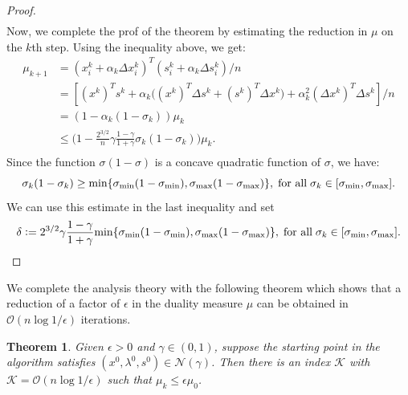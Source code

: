 \documentclass[a4paper,10 pt,titlepage,twoside]{book}
\theoremstyle{plain}
\newtheorem{thm}{Theorem}[chapter]
\theoremstyle{definition}
\theoremstyle{remark}
\begin{document}
\begin{proof}
\begin{align*}
	\end{align*}
	Now, we complete the prof of the theorem by estimating the reduction in $\mu$ on the $k$th step. Using the inequality above, we get:
	\begin{align*}
	\mu_{k+1}& = (x_{i}^{k} + \alpha_{k}\Delta x_{i}^{k})^{T}(s_{i}^{k} + \alpha_{k}\Delta s_{i}^{k})/n\\
	& = [(x^{k})^{T}s^{k} + \alpha_{k}\big((x^{k})^{T}\Delta s^{k} + (s^{k})^{T}\Delta x^{k}\big) +\alpha^{2}_{k}(\Delta x^{k})^{T}\Delta s^{k}]/n\\
	& = (1 - \alpha_{k}(1-\sigma_{k}))\mu_{k}\\
	& \leq \Big(1 - \frac{2^{3/2}}{n}\gamma\frac{1-\gamma}{1+\gamma}\sigma_{k}(1-\sigma_{k})\Big)\mu_{k}.\\
	\end{align*}
	Since the function $\sigma(1 - \sigma)$ is a concave quadratic function of $\sigma$, we have:
	\begin{equation*}
	\sigma_{k}(1-\sigma_{k})\geq \text{min}\{\sigma_{\text{min}}(1-\sigma_{\text{min}}),\sigma_{\text{max}}(1-\sigma_{\text{max}})\}, \text{\;for all\;}\sigma_{k}\in[\sigma_{\text{min}},\sigma_{\text{max}}].
	\end{equation*}
	We can use this estimate in the last inequality and set
	\begin{equation*}
	\delta \vcentcolon=2^{3/2}\gamma\frac{1-\gamma}{1+\gamma}\text{\text{min}}\{\sigma_{\text{min}}(1-\sigma_{\text{min}}),\sigma_{\text{max}}(1-\sigma_{\text{max}})\}, \text{\;for all\;}\sigma_{k}\in[\sigma_{\text{min}},\sigma_{\text{max}}].
	\end{equation*}
\end{proof}
We complete the analysis theory with the following theorem which shows that a reduction of a factor of $\epsilon$ in the duality measure $\mu$ can be obtained in $\mathcal{O}(n\log{1/\epsilon})$ iterations.
\begin{thm}
	Given $\epsilon>0$ and $\gamma\in(0,1)$, suppose the starting point in the algorithm satisfies $(x^{0},\lambda^{0},s^{0})\in\mathcal{N}(\gamma)$. Then there is an index $\mathcal{K}$ with $\mathcal{K}=\mathcal{O}(n\log1/\epsilon)$ such that $\mu_{k}\leq\epsilon\mu_{0}$.
\end{thm}
\end{document}
